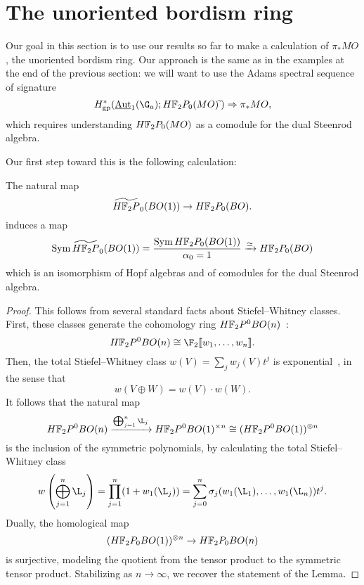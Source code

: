 \section{The unoriented bordism ring}\label{PiStarMOSection}

Our goal in this section is to use our results so far to make a calculation of \(\pi_* MO\), the unoriented bordism ring.  Our approach is the same as in the examples at the end of the previous section: we will want to use the Adams spectral sequence of signature \[H^*_{\mathrm{gp}}(\InternalAut_1(\G_a); \HFtwo P_0(MO)\widetilde{\:}) \Rightarrow \pi_* MO,\] which requires understanding \(\HFtwo P_0(MO)\) as a comodule for the dual Steenrod algebra.

Our first step toward this is the following calculation:
\begin{lemma}\label{HF2BOIsSymAlg}
The natural map \[\widetilde{\HFtwo P}_0(BO(1)) \to \HFtwo P_0(BO).\] induces a map \[\Sym \widetilde{\HFtwo P}_0(BO(1)) = \frac{\Sym \HFtwo P_0(BO(1))}{\alpha_0 = 1} \xrightarrow{\simeq} \HFtwo P_0(BO)\] which is an isomorphism of Hopf algebras and of comodules for the dual Steenrod algebra.
\end{lemma}
\begin{proof}
This follows from several standard facts about Stiefel--Whitney classes.  First, these classes generate the cohomology ring \(\HFtwo P^0 BO(n)\)~\cite[Theorem 16.10]{Switzer}: \[\HFtwo P^0 BO(n) \cong \F_2\ps{w_1, \ldots, w_n}.\]  Then, the total Stiefel--Whitney class \(w(V) = \sum_j w_j(V) t^j\) is exponential~\cite[Theorem 16.3]{Switzer}, in the sense that \[w(V \oplus W) = w(V) \cdot w(W).\]  It follows that the natural map \[\HFtwo P^0 BO(n) \xrightarrow{\bigoplus_{j=1}^n \L_j} \HFtwo P^0 BO(1)^{\times n} \cong (\HFtwo P^0 BO(1))^{\otimes n}\] is the inclusion of the symmetric polynomials, by calculating the total Stiefel--Whitney class \[w\left( \bigoplus_{j=1}^n \L_j \right) = \prod_{j=1}^n (1 + w_1(\L_j)) = \sum_{j=0}^n \sigma_j(w_1(\L_1), \ldots, w_1(\L_n)) t^j.\]  Dually, the homological map \[(\HFtwo P_0 BO(1))^{\otimes n} \to \HFtwo P_0 BO(n)\] is surjective, modeling the quotient from the tensor product to the symmetric tensor product.  Stabilizing as \(n \to \infty\), we recover the statement of the Lemma.
\end{proof}

